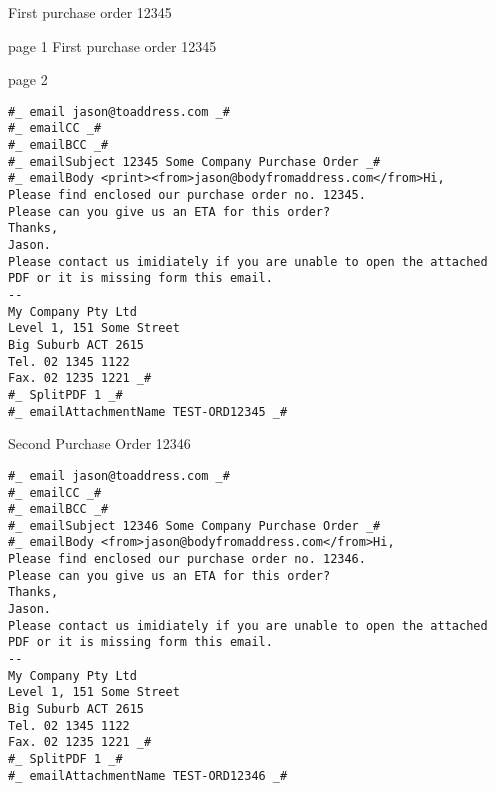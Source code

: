 \documentclass{article}
\begin{document}
\thispagestyle{empty}
First purchase order 12345

page 1
\newpage
First purchase order 12345

page 2

\newpage
\thispagestyle{empty}
\begin{verbatim}
#_ email jason@toaddress.com _#
#_ emailCC _#
#_ emailBCC _#
#_ emailSubject 12345 Some Company Purchase Order _#
#_ emailBody <print><from>jason@bodyfromaddress.com</from>Hi,
Please find enclosed our purchase order no. 12345.
Please can you give us an ETA for this order?
Thanks,
Jason.
Please contact us imidiately if you are unable to open the attached
PDF or it is missing form this email.
--
My Company Pty Ltd
Level 1, 151 Some Street
Big Suburb ACT 2615
Tel. 02 1345 1122
Fax. 02 1235 1221 _#
#_ SplitPDF 1 _#
#_ emailAttachmentName TEST-ORD12345 _#
\end{verbatim}
\newpage
\thispagestyle{empty}
Second Purchase Order 12346
\newpage
\thispagestyle{empty}
\begin{verbatim}
#_ email jason@toaddress.com _#
#_ emailCC _#
#_ emailBCC _#
#_ emailSubject 12346 Some Company Purchase Order _#
#_ emailBody <from>jason@bodyfromaddress.com</from>Hi,
Please find enclosed our purchase order no. 12346.
Please can you give us an ETA for this order?
Thanks,
Jason.
Please contact us imidiately if you are unable to open the attached
PDF or it is missing form this email.
--
My Company Pty Ltd
Level 1, 151 Some Street
Big Suburb ACT 2615
Tel. 02 1345 1122
Fax. 02 1235 1221 _#
#_ SplitPDF 1 _#
#_ emailAttachmentName TEST-ORD12346 _#
\end{verbatim}
\newpage
\end{document}
